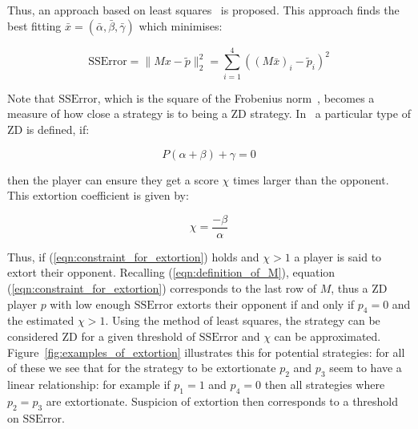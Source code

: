 \documentclass[a4paper]{article}
\begin{document}
Thus, an approach based on least squares~\cite{Golub2013} is proposed. This
approach finds the best fitting \(\bar x=(\bar\alpha, \bar\beta,
\bar\gamma)\) which minimises:

\begin{equation}\label{eqn:r_squared}
    \text{SSError} = \|M x-\tilde p\|_2^2 = \sum_{i=1}^{4}\left((M\bar x)_i-\tilde p_i\right)^2
\end{equation}

Note that \(\text{SSError}\), which is the square of the Frobenius
norm~\cite{Golub2013}, becomes a measure of how close a strategy is to being a ZD
strategy.
In~\cite{Press2012} a particular type of ZD is defined, if:

\begin{equation}\label{eqn:constraint_for_extortion}
    P(\alpha + \beta)+\gamma=0
\end{equation}

then the player can ensure they get a score \(\chi\) times
larger than the opponent. This extortion coefficient is given by:

\begin{equation}\label{eqn:definition_of_chi}
    \chi=\frac{-\beta}{\alpha}
\end{equation}

Thus, if (\ref{eqn:constraint_for_extortion}) holds and \(\chi >1\) a player is
said to extort their opponent. Recalling (\ref{eqn:definition_of_M}), equation
(\ref{eqn:constraint_for_extortion}) corresponds to the last row of \(M\), thus
a ZD player \(p\) with low enough \(\text{SSError}\) extorts their opponent if
and only if \(p_4=0\) and the estimated \(\chi > 1\). Using the method of least
squares, the strategy can be considered ZD for a given threshold of
\(\text{SSError}\) and \(\chi\) can be approximated.
Figure~\ref{fig:examples_of_extortion} illustrates this for potential
strategies: for all of these we see that for the strategy to be extortionate
\(p_2\) and \(p_3\) seem to have a linear relationship: for example if \(p_1=1\)
and \(p_4=0\) then all strategies where \(p_2=p_3\) are extortionate. Suspicion
of extortion then corresponds to a threshold on \(\text{SSError}\).
\end{document}
